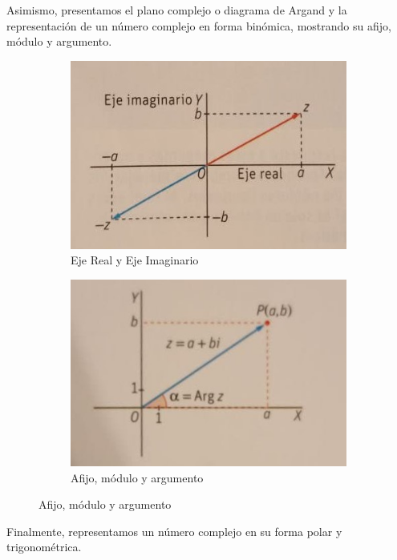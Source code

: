\documentclass[../main.tex]{memoir}
\begin{document}
Asimismo, presentamos el plano complejo o diagrama de Argand y la representación de un número complejo en forma binómica, mostrando su afijo, módulo y argumento.
\begin{figure}[H]
	\centering
	\begin{subfigure}{0.48\textwidth}
		\centering
		\includegraphics[width=\linewidth]{images/ejes.jpg}
		\caption{Eje Real y Eje Imaginario}
	\end{subfigure}
	\begin{subfigure}{0.48\textwidth}
		\centering
		\includegraphics[width=\linewidth]{images/afijo.jpg}
		\caption{Afijo, módulo y argumento}
	\end{subfigure}
	\label{fig:representacion2}
\end{figure}

Finalmente, representamos un número complejo en su forma polar y trigonométrica.
\end{document}
